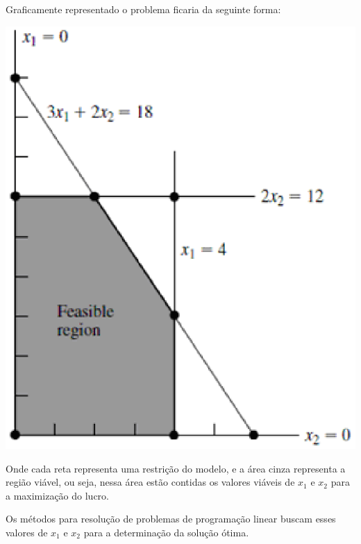 Graficamente representado o problema ficaria da seguinte forma:
\begin{center}
	\includegraphics[scale=0.5]{graficos/simplex_grafico}
	\label{img:simplex_grafico}
\end{center}

Onde cada reta representa uma restrição do modelo, e a área cinza representa a região viável, ou seja, nessa área estão contidas os valores viáveis de $x_{1}$ e $x_{2}$ para a maximização do lucro.

Os métodos para resolução de problemas de programação linear buscam esses valores de $x_{1}$ e $x_{2}$  para a determinação da solução ótima.

